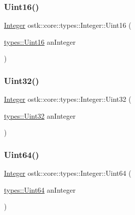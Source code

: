 \mbox{\label{classostk_1_1core_1_1types_1_1_integer_a0ee4452c144dc4ec7f89015bb899ecc6}} 
\subsubsection{\texorpdfstring{Uint16()}{Uint16()}}
{\footnotesize\ttfamily \hyperlink{classostk_1_1core_1_1types_1_1_integer}{Integer} ostk\+::core\+::types\+::\+Integer\+::\+Uint16 (\begin{DoxyParamCaption}\item[{\hyperlink{namespaceostk_1_1core_1_1types_aacabe89aeeaa93c0bbfe3b4e04454e45}{types\+::\+Uint16}}]{an\+Integer }\end{DoxyParamCaption})\hspace{0.3cm}{\ttfamily [static]}}

\mbox{\label{classostk_1_1core_1_1types_1_1_integer_aa5b3b8585bb7db26c4870f92c399fe46}} 
\subsubsection{\texorpdfstring{Uint32()}{Uint32()}}
{\footnotesize\ttfamily \hyperlink{classostk_1_1core_1_1types_1_1_integer}{Integer} ostk\+::core\+::types\+::\+Integer\+::\+Uint32 (\begin{DoxyParamCaption}\item[{\hyperlink{namespaceostk_1_1core_1_1types_a821738d6849fcc24698839971deccbb9}{types\+::\+Uint32}}]{an\+Integer }\end{DoxyParamCaption})\hspace{0.3cm}{\ttfamily [static]}}

\mbox{\label{classostk_1_1core_1_1types_1_1_integer_a0c65373c2e1cbd463b2fef27dae26228}} 
\subsubsection{\texorpdfstring{Uint64()}{Uint64()}}
{\footnotesize\ttfamily \hyperlink{classostk_1_1core_1_1types_1_1_integer}{Integer} ostk\+::core\+::types\+::\+Integer\+::\+Uint64 (\begin{DoxyParamCaption}\item[{\hyperlink{namespaceostk_1_1core_1_1types_a0c1d18a4608c61f9cac139054b725689}{types\+::\+Uint64}}]{an\+Integer }\end{DoxyParamCaption})\hspace{0.3cm}{\ttfamily [static]}}


